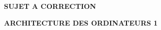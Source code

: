 \documentclass[11pt,a4paper]{article}
\newcommand{\TitreMatiere}{Architecture des Ordinateurs 1}
\begin{document}

%
%

\clearpage



\vfillFirst

\begin{center}

\begin{LARGE}
\textbf{SUJET A CORRECTION}

\bigskip

\textbf{\MakeUppercase{\TitreMatiere}}
\end{LARGE}

\end{center}

\vfillLast
\end{document}
